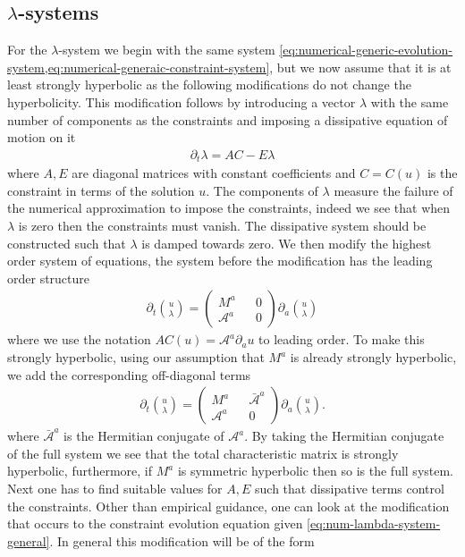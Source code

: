 \documentclass[10pt]{report}
\theoremstyle{definition}
\begin{document}
\subsection{\texorpdfstring{$\lambda$}{λ}-systems} \label{subsec:lambda-system}
For the $\lambda$-system we begin with the same system \cref{eq:numerical-generic-evolution-system,eq:numerical-generaic-constraint-system}, but we now assume that it is at least strongly hyperbolic as the following modifications do not change the hyperbolicity. This modification follows by introducing a vector $\lambda$ with the same number of components as the constraints and imposing a dissipative equation of motion on it 
\begin{align}
    \partial_t \lambda = A C - E \lambda \label{eq:num-lambda-system-dissipative-equations}
\end{align}
where $A,E$ are diagonal matrices with constant coefficients and $C = C(u)$ is the constraint in terms of the solution $u$. The components of $\lambda$ measure the failure of the numerical approximation to impose the constraints, indeed we see that when $\lambda$ is zero then the constraints must vanish. The dissipative system should be constructed such that $\lambda$ is damped towards zero. We then modify the highest order system of equations, the system before the modification has the leading order structure
\begin{align}
    \partial_t \binom{u}{\lambda} = \begin{pmatrix}
        M^a && 0 \\ \mathcal{A}^a && 0
    \end{pmatrix} \partial_a \binom{u}{\lambda}
\end{align}
where we use the notation $A C(u) = \mathcal{A}^a \partial_a u$ to leading order. To make this strongly hyperbolic, using our assumption that $M^a$ is already strongly hyperbolic, we add the corresponding off-diagonal terms
\begin{align}
    \partial_t \binom{u}{\lambda} = \begin{pmatrix}
        M^a && \bar{\mathcal{A}}^a \\ \mathcal{A}^a && 0
    \end{pmatrix} \partial_a \binom{u}{\lambda}. \label{eq:num-lambda-system-general}
\end{align}
where $\bar{\mathcal{A}}^a$ is the Hermitian conjugate of $\mathcal{A}^a$. By taking the Hermitian conjugate of the full system we see that the total characteristic matrix is strongly hyperbolic, furthermore, if $M^a$ is symmetric hyperbolic then so is the full system. Next one has to find suitable values for $A,E$ such that dissipative terms control the  constraints. Other than empirical guidance, one can look at the modification that occurs to the constraint evolution equation given \cref{eq:num-lambda-system-general}. In general this modification will be of the form 
\end{document}
